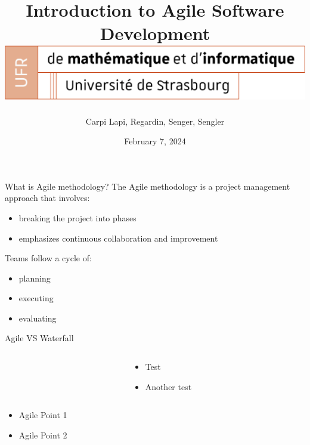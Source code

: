\documentclass[10pt]{beamer}
\title[Introduction to Agile Software Development]{
  Introduction to Agile Software Development \\
  \vspace{1cm}
  \includegraphics[width=0.6\pdfpagewidth]{images/logo_Uni.png}
}
\author[SuperAgile]{Carpi Lapi, Regardin, Senger, Sengler}
\date[February 7, 2024]{February 7, 2024}
\begin{document}
\frame{\titlepage}

\begin{frame}{What is Agile methodology?}
The Agile methodology is a project management approach that involves:
\begin{itemize}
    \item breaking the project into phases
    \item emphasizes continuous collaboration and improvement \\
    \vspace{1cm}
\end{itemize}

Teams follow a cycle of: 
\begin{itemize}
    \item planning
    \item executing
    \item evaluating
\end{itemize}

\end{frame}


\begin{frame}{Agile VS Waterfall}
  
  \begin{columns}[T]
    \begin{column}{0.5\textwidth}
    \end{column}

    \begin{column}{0.5\textwidth}
      \begin{itemize}
        \item<2> Test
        \item<2> Another test
      \end{itemize}
    \end{column}
  \end{columns}

  \begin{columns}[T]
    \begin{column}{0.5\textwidth}
      \begin{itemize}
        \item<3> Agile Point 1
        \item<3> Agile Point 2
      \end{itemize}
    \end{column}

    \begin{column}{0.5\textwidth}
    \end{column}
  \end{columns}
\end{frame}
\end{document}
